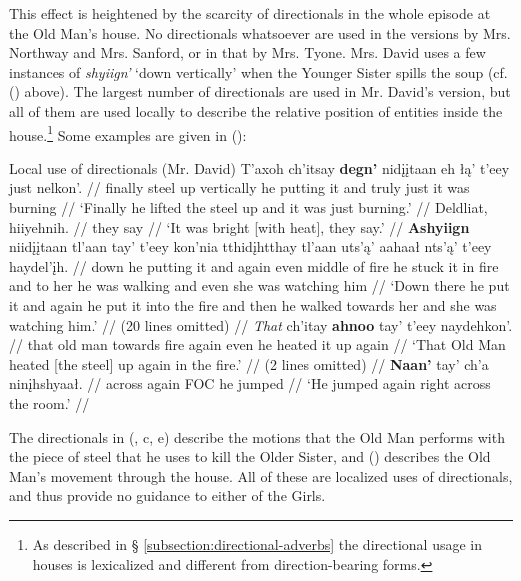 This effect is heightened by the scarcity of directionals in the whole episode at the Old Man's house. No directionals whatsoever are used in the versions by Mrs. Northway and Mrs. Sanford, or in that by Mrs. Tyone. Mrs. David uses a few instances of \textit{shyiign'} `down vertically' when the Younger Sister spills the soup (cf. () above). The largest number of directionals are used in Mr. David's version, but all of them are used locally to describe the relative position of entities inside the house.\footnote{As described in § \ref{subsection:directional-adverbs} the directional usage in houses is lexicalized and different from direction-bearing forms.} Some examples are given in ():

\pex Local use of directionals (Mr. David) 
\a
\begingl
\gla T'axoh ch'itsay \textbf{degn'} nidįįtaan eh łą' t'eey just nelkon'.  //
\glb finally steel {up vertically} {he putting it} and truly just {it was burning} //
\glft `Finally he lifted the steel up and it was just burning.' //
\endgl
\a
\begingl
\gla Deldliat, hiiyehnih.  //
 {they say} //
\glft `It was bright [with heat], they say.' //
\endgl
\a
\begingl
\gla \textbf{Ashyiign} niidįįtaan tl'aan tay' t'eey kon'nia tthidįhtthay tl'aan uts'ą' aahaał nts'ą' t'eey haydel'įh.  //
\glb down {he putting it} and again even {middle of fire} {he stuck it in fire} and {to her} {he was walking} and even {she was watching him} //
\glft `Down there he put it and again he put it into the fire and then he walked towards her and she was watching him.' //
\endgl
\a
\begingl
\gla (20 lines omitted) //
\endgl
\a
\begingl
\gla \textit{That} ch'itay \textbf{ahnoo} tay' t'eey naydehkon'.  //
\glb that {old man} {towards fire} again even {he heated it up again} //
\glft `That Old Man heated [the steel] up again in the fire.' //
\endgl
\a
\begingl
\gla (2 lines omitted) //
\endgl
\a
\begingl
\gla \textbf{Naan'} tay' ch'a ninįhshyaał.  //
\glb across again FOC {he jumped} //
\glft `He jumped again right across the room.' //
\endgl
\xe

The directionals in (, {c}, {e}) describe the motions that the Old Man performs with the piece of steel that he uses to kill the Older Sister, and () describes the Old Man's movement through the house. All of these are localized uses of directionals, and thus provide no guidance to either of the Girls.

